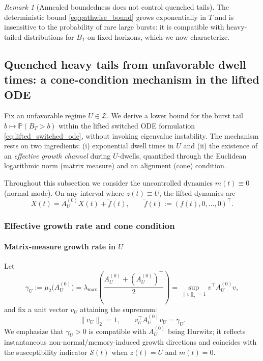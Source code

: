 \documentclass[12pt,a4paper]{article}
\theoremstyle{definition}
\theoremstyle{remark}
\newtheorem{remark}{Remark}
\begin{document}
\begin{remark}[Annealed boundedness does not control quenched tails]
	The deterministic bound \eqref{eq:pathwise_bound} grows exponentially in $T$ and is insensitive to the probability of rare large bursts:
	it is compatible with heavy-tailed distributions for $B_T$ on fixed horizons, which we now characterize.
\end{remark}









\subsection{Quenched heavy tails from unfavorable dwell times: a cone-condition mechanism in the lifted ODE}
\label{subsec:quenched_tails}

Fix an unfavorable regime $U\in\mathcal{Z}$. We derive a lower bound for the burst tail
$b\mapsto\mathbb{P}(B_T>b)$ within the lifted switched ODE formulation \eqref{eq:lifted_switched_ode},
without invoking eigenvalue instability. The mechanism rests on two ingredients:
(i) exponential dwell times in $U$ and (ii) the existence of an \emph{effective growth channel} during $U$-dwells,
quantified through the Euclidean logarithmic norm (matrix measure) and an alignment (cone) condition.

Throughout this subsection we consider the uncontrolled dynamics $m(t)\equiv 0$ (normal mode).
On any interval where $z(t)\equiv U$, the lifted dynamics are
\begin{equation}\label{eq:U_dwell_dynamics}
	\dot X(t)=A_U^{(0)}X(t)+\widetilde f(t),
	\qquad \widetilde f(t):=(f(t),0,\dots,0)^\top .
\end{equation}

\subsubsection*{Effective growth rate and cone condition}

\paragraph{Matrix-measure growth rate in $U$}
Let
\begin{equation}\label{eq:gammaU_S_def}
	\gamma_U
	:=
	\mu_2\!\big(A_U^{(0)}\big)
	=
	\lambda_{\max}\!\left(\frac{A_U^{(0)}+(A_U^{(0)})^\top}{2}\right)
	=
	\sup_{\|v\|_2=1} v^\top A_U^{(0)} v,
\end{equation}
and fix a unit vector $v_U$ attaining the supremum:
\begin{equation}\label{eq:vU_top_def}
	\|v_U\|_2=1,
	\qquad
	v_U^\top A_U^{(0)} v_U=\gamma_U.
\end{equation}
We emphasize that $\gamma_U>0$ is compatible with $A_U^{(0)}$ being Hurwitz; it reflects instantaneous non-normal/memory-induced
growth directions and coincides with the susceptibility indicator $\mathcal{S}(t)$ when $z(t)=U$ and $m(t)=0$.
\end{document}
